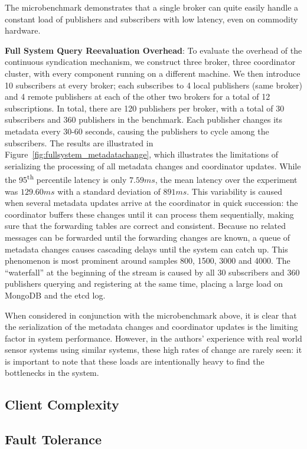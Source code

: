The microbenchmark demonstrates that a single broker can quite easily handle a constant load of publishers and subscribers with low latency, even on commodity hardware.

\textbf{Full System Query Reevaluation Overhead}: To evaluate the overhead of the continuous syndication mechanism, we construct three broker, three coordinator cluster, with every component running on a different machine.
We then introduce 10 subscribers at every broker; each subscribes to 4 local publishers (same broker) and 4 remote publishers at each of the other two brokers for a total of 12 subscriptions.
In total, there are 120 publishers per broker, with a total of 30 subscribers and 360 publishers in the benchmark.
Each publisher changes its metadata every 30-60 seconds, causing the publishers to cycle among the subscribers.
The results are illustrated in Figure~\ref{fig:fullsystem_metadatachange}, which illustrates the limitations of serializing the processing of all metadata changes and coordinator updates.
While the 95\textsuperscript{th} percentile latency is only $7.59ms$, the mean latency over the experiment was $129.60ms$ with a standard deviation of $891ms$.
This variability is caused when several metadata updates arrive at the coordinator in quick succession: the coordinator buffers these changes until it can process them sequentially, making sure that the forwarding tables are correct and consistent.
Because no related messages can be forwarded until the forwarding changes are known, a queue of metadata changes causes cascading delays until the system can catch up.
This phenomenon is most prominent around samples 800, 1500, 3000 and 4000.
The ``waterfall'' at the beginning of the stream is caused by all 30 subscribers and 360 publishers querying and registering at the same time, placing a large load on MongoDB and the etcd log.

When considered in conjunction with the microbenchmark above, it is clear that the serialization of the metadata changes and coordinator updates is the limiting factor in system performance.
However, in the authors' experience with real world sensor systems using similar systems, these high rates of change are rarely seen: it is important to note that these loads are intentionally heavy to find the bottlenecks in the system.

\subsection{Client Complexity}

\subsection{Fault Tolerance}
